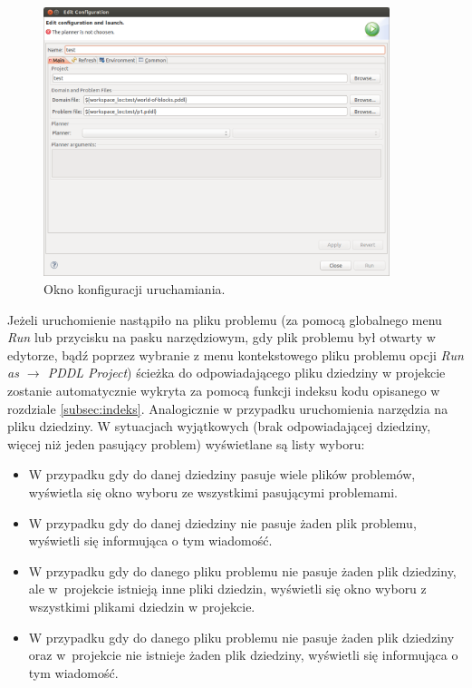 \begin{figure}[h!]
    \centering
    \includegraphics[width=0.9\textwidth]{img/run_configuration_window}
    \caption{Okno konfiguracji uruchamiania.}
    \label{fig:run_configuration_window}
\end{figure}

Jeżeli uruchomienie nastąpiło na pliku problemu (za pomocą globalnego menu \emph{Run} lub przycisku na pasku narzędziowym, gdy plik problemu był otwarty w edytorze, bądź poprzez wybranie z menu kontekstowego pliku problemu opcji \emph{Run as $\rightarrow$ PDDL Project}) ścieżka do odpowiadającego pliku dziedziny w projekcie zostanie automatycznie wykryta za pomocą funkcji indeksu kodu opisanego w rozdziale \ref{subsec:indeks}. Analogicznie w przypadku uruchomienia narzędzia na pliku dziedziny. W sytuacjach wyjątkowych (brak odpowiadającej dziedziny, więcej niż jeden pasujący problem) wyświetlane są listy wyboru:
\begin{itemize}
\item W przypadku gdy do danej dziedziny pasuje wiele plików problemów, wyświetla się okno wyboru ze wszystkimi pasującymi problemami.
\item W przypadku gdy do danej dziedziny nie pasuje żaden plik problemu, wyświetli się informująca o tym wiadomość.
\item W przypadku gdy do danego pliku problemu nie pasuje żaden plik dziedziny, ale w~projekcie istnieją inne pliki dziedzin, wyświetli się okno wyboru z wszystkimi plikami dziedzin w projekcie.
\item W przypadku gdy do danego pliku problemu nie pasuje żaden plik dziedziny oraz w~projekcie nie istnieje żaden plik  dziedziny, wyświetli się informująca o tym wiadomość.
\end{itemize}

